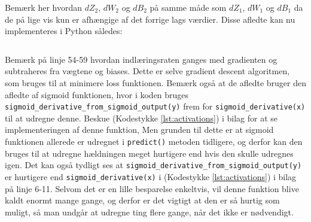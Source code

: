 \documentclass{article}
\newcommand{\listingref}[1]{(Kodestykke \ref{#1})}
\begin{document}
Bemærk her hvordan $dZ_2$, $dW_2$ og $dB_2$ på samme måde som $dZ_1$, $dW_1$ og $dB_1$ da de på lige vis kun er afhængige af det forrige lags værdier. Disse afledte kan nu implementeres i Python således:
\inputminted[firstline=43, lastline=61]{python}{train.py}\noindent
Bemærk på linje 54-59 hvordan indlæringsraten ganges med gradienten og subtraheres fra vægtene og biases. Dette er selve gradient descent algoritmen, som bruges til at minimere loss funktionen. Bemærk også at de afledte bruger den afledte af sigmoid funktionen, hvor i koden bruges \texttt{sigmoid\_derivative\_from\_sigmoid\_output(y)} frem for \texttt{sigmoid\_derivative(x)} til at udregne denne. Beskue \listingref{lst:activations} i bilag for at se implementeringen af denne funktion, Men grunden til dette er at sigmoid funktionen allerede er udregnet i \texttt{predict()} metoden tidligere, og derfor kan den bruges til at udregne hældningen meget hurtigere end hvis den skulle udregnes igen. Det kan også tydligt ses at \texttt{sigmoid\_derivative\_from\_sigmoid\_output(y)} er hurtigere end \texttt{sigmoid\_derivative(x)} i \listingref{lst:activations} i bilag på linje 6-11. Selvom det er en lille besparelse enkeltvis, vil denne funktion blive kaldt enormt mange gange, og derfor er det vigtigt at den er så hurtig som muligt, så man undgår at udregne ting flere gange, når det ikke er nødvendigt. \parencite{smith2024sigmoid}
\end{document}
